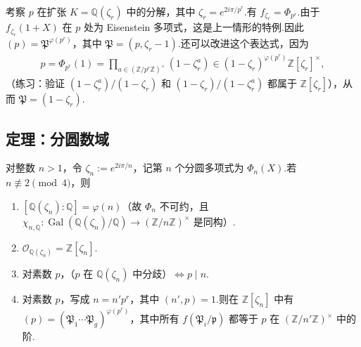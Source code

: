 \begin{example*}[$p$-分圆情形]
考察 $p$ 在扩张 $K=\mathbb Q(\zeta_r)$ 中的分解，其中 $\zeta_r=e^{2i\pi/p^r}$.有 $f_{\zeta_r}=\Phi_{p^r}$.由于 $f_{\zeta_r}(1+X)$ 在 $p$ 处为 Eisenstein 多项式，这是上一情形的特例.因此 $(p)=\mathfrak P^{\varphi(p^r)}$，其中 $\mathfrak P=(p,\zeta_r-1)$.还可以改进这个表达式，因为
\begin{align*}
p=\Phi_{p^r}(1)=\prod_{a\in(\mathbb Z/p^r\mathbb Z)^\times}(1-\zeta_r^a)
\in(1-\zeta_r)^{\varphi(p^r)}\mathbb Z[\zeta_r]^\times,
\end{align*}
（练习：验证 $(1-\zeta_r^a)/(1-\zeta_r)$ 和 $(1-\zeta_r)/(1-\zeta_r^a)$ 都属于 $\mathbb Z[\zeta_r]$），从而 $\mathfrak P=(1-\zeta_r)$.
\end{example*}

\subsection{定理：分圆数域}\label{sec:nt-3-4-5}
\begin{theorem*}
对整数 $n>1$，令 $\zeta_n:=e^{2i\pi/n}$，记第 $n$ 个分圆多项式为 $\Phi_n(X)$.若 $n\not\equiv2\pmod4$，则
\begin{enumerate}[label=\roman*)]
\item $[\mathbb Q(\zeta_n):\mathbb Q]=\varphi(n)$（故 $\Phi_n$ 不可约，且 $\chi_{n,\mathbb Q}:\operatorname{Gal}(\mathbb Q(\zeta_n)/\mathbb Q)\longrightarrow(\mathbb Z/n\mathbb Z)^\times$ 是同构）.
\item $\mathcal O_{\mathbb Q(\zeta_n)}=\mathbb Z[\zeta_n]$.
\item 对素数 $p$，（$p$ 在 $\mathbb Q(\zeta_n)$ 中分歧）$\Leftrightarrow p\mid n$.
\item 对素数 $p$，写成 $n=n'p^r$，其中 $(n',p)=1$.则在 $\mathbb Z[\zeta_n]$ 中有 $(p)=(\mathfrak P_1\cdots\mathfrak P_g)^{\varphi(p^r)}$，其中所有 $f(\mathfrak P_i/\mathfrak p)$ 都等于 $p$ 在 $(\mathbb Z/n'\mathbb Z)^\times$ 中的阶.
\end{enumerate}
\end{theorem*}
